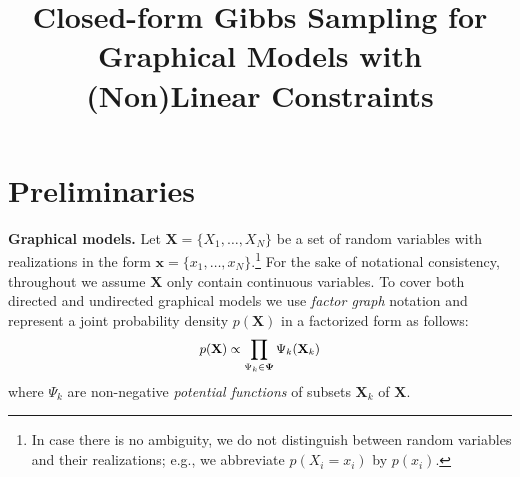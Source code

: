 \documentclass[letterpaper]{article}
\renewcommand{\vec}[1]{\mathbf{#1}}
\newcommand{\bvec}[1]{\textbf{#1}}
\newcommand{\pr}{p}
\begin{document}
%
\title{Closed-form Gibbs Sampling for Graphical Models with (Non)Linear Constraints}
\maketitle







\section{Preliminaries}
\label{sect:background}
{\bf Graphical models.} Let $\vec{X} = \{X_1, \ldots, X_N\}$ be a set of random variables with realizations in the form 
$\vec{x} = \{x_1, \ldots, x_N\}$.\footnote{
In case there is no ambiguity, we do not distinguish between random variables and their realizations; e.g., we abbreviate $\pr(X_i = x_i)$ by $\pr(x_i)$.}
For the sake of notational consistency, 
throughout we assume $\vec{X}$ only contain continuous variables. 
To cover both directed and undirected graphical models we use
\emph{factor graph} notation \cite{kschischang2001factor}
and represent a joint probability density $\pr(\vec{X})$ in a factorized form as follows: 
\begin{equation} \footnotesize
\label{e:factor-graph}
\pr(\vec{X}) \propto \prod_{\Psi_k \in \boldsymbol\Psi} \Psi_k (\vec{X}_k)
\end{equation}
where 
$\Psi_k$ are non-negative \emph{potential functions} 
of subsets $\bvec{X}_k$ of $\bvec{X}$. 
\end{document}
